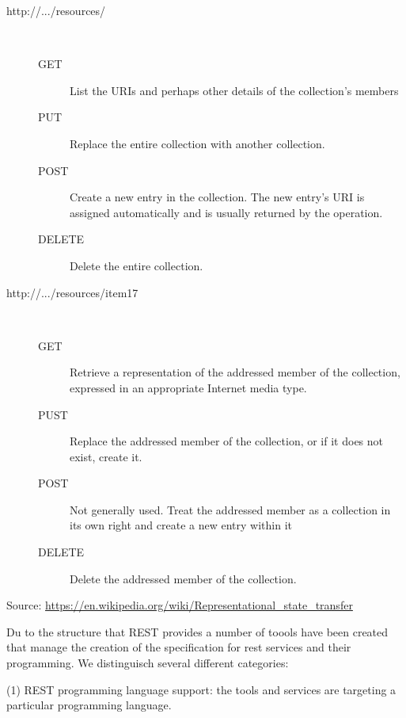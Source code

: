 \begin{description}

\item[http://.../resources/] ~\\

    \begin{description} 
    \item[GET] List the URIs and perhaps other details of the
      collection’s members
    \item[PUT] Replace the entire collection with another collection.
    \item[POST] Create a new entry in the collection. The new entry’s
      URI is assigned automatically and is usually returned by the
      operation.
    \item[DELETE] Delete the entire collection.
\end{description} 

\item[http://.../resources/item17] ~\\

    \begin{description} 

    \item[GET] Retrieve a representation of the addressed member of
      the collection, expressed in an appropriate Internet media type.

    \item[PUST] Replace the addressed member of the collection, or if
      it does not exist, create it.

    \item[POST] Not generally used. Treat the addressed member as a
      collection in its own right and create a new entry within it
                               
\item[DELETE] Delete the addressed member of the collection. 
\end{description} 
\end{description}

Source:
\url{https://en.wikipedia.org/wiki/Representational_state_transfer}


Du to the structure that REST provides a number of toools have been
created that manage the creation of the specification for rest
services and their programming. We distinguisch several different
categories:

(1) REST programming language support: the tools and services are
targeting a particular programming language.


